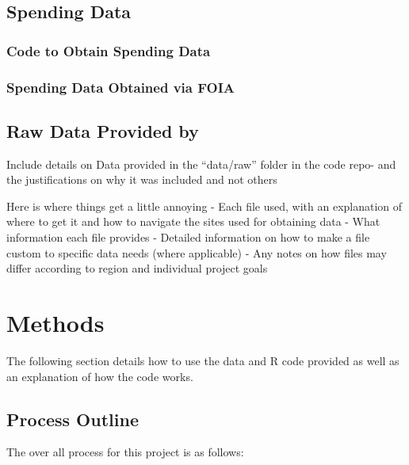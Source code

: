 \documentclass[
]{book}
\begin{document}
\hypertarget{spending-data-1}{%
\section{Spending Data}\label{spending-data-1}}

\hypertarget{code-to-obtain-spending-data-1}{%
\subsection{Code to Obtain Spending Data}\label{code-to-obtain-spending-data-1}}

\hypertarget{spending-data-obtained-via-foia-1}{%
\subsection{Spending Data Obtained via FOIA}\label{spending-data-obtained-via-foia-1}}

\hypertarget{raw-data-provided-by-1}{%
\section{Raw Data Provided by}\label{raw-data-provided-by-1}}

Include details on Data provided in the ``data/raw'' folder in the code repo- and the justifications on why it was included and not others

Here is where things get a little annoying
- Each file used, with an explanation of where
to get it and how to navigate the sites used for obtaining data
- What information each file provides
- Detailed information on how to make a file custom to specific data needs (where applicable)
- Any notes on how files may differ according to region and individual project goals

\hypertarget{methods}{%
\chapter{Methods}\label{methods}}

The following section details how to use the data and R code provided as well as an explanation of how the code works.

\hypertarget{process-outline}{%
\section{Process Outline}\label{process-outline}}

The over all process for this project is as follows:
\end{document}
